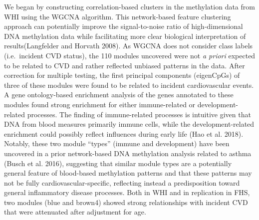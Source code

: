 \documentclass[]{article}
\theoremstyle{definition}
\theoremstyle{definition}
\theoremstyle{definition}
\theoremstyle{remark}
\begin{document}
We began by constructing correlation-based clusters in the methylation
data from WHI using the WGCNA algorithm. This network-based feature
clustering approach can potentially improve the signal-to-noise ratio of
high-dimensional DNA methylation data while facilitating more clear
biological interpretation of results(Langfelder and Horvath 2008). As
WGCNA does not consider class labels (i.e.~incident CVD status), the 110
modules uncovered were not \emph{a priori} expected to be related to CVD
and rather reflected unbiased patterns in the data. After correction for
multiple testing, the first principal components (eigenCpGs) of three of
these modules were found to be related to incident cardiovascular
events. A gene ontology-based enrichment analysis of the genes annotated
to these modules found strong enrichment for either immune-related or
development-related processes. The finding of immune-related processes
is intuitive given that DNA from blood measures primarily immune cells,
while the development-related enrichment could possibly reflect
influences during early life (Hao et al. 2018). Notably, these two
module ``types'' (immune and development) have been uncovered in a prior
network-based DNA methylation analysis related to asthma (Busch et al.
2016), suggesting that similar module types are a potentially general
feature of blood-based methylation patterns and that these patterns may
not be fully cardiovascular-specific, reflecting instead a
predisposition toward general inflammatory disease processes. Both in
WHI and in replication in FHS, two modules (blue and brown4) showed
strong relationships with incident CVD that were attenuated after
adjustment for age.
\end{document}
